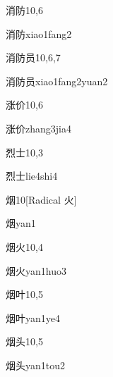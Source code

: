 \begin{entry}{消防}{10,6}
  \begin{phonetics}{消防}{xiao1fang2}
  \end{phonetics}
\end{entry}

\begin{entry}{消防员}{10,6,7}
  \begin{phonetics}{消防员}{xiao1fang2yuan2}
  \end{phonetics}
\end{entry}

\begin{entry}{涨价}{10,6}
  \begin{phonetics}{涨价}{zhang3jia4}
  \end{phonetics}
\end{entry}

\begin{entry}{烈士}{10,3}
  \begin{phonetics}{烈士}{lie4shi4}
  \end{phonetics}
\end{entry}

\begin{entry}{烟}{10}[Radical 火]
  \begin{phonetics}{烟}{yan1}
  \end{phonetics}
\end{entry}

\begin{entry}{烟火}{10,4}
  \begin{phonetics}{烟火}{yan1huo3}
  \end{phonetics}
\end{entry}

\begin{entry}{烟叶}{10,5}
  \begin{phonetics}{烟叶}{yan1ye4}
  \end{phonetics}
\end{entry}

\begin{entry}{烟头}{10,5}
  \begin{phonetics}{烟头}{yan1tou2}
  \end{phonetics}
\end{entry}

